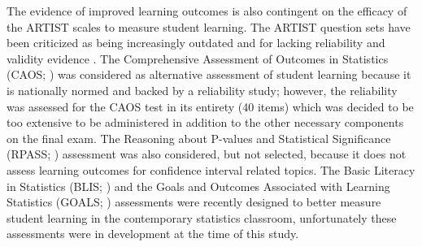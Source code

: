 

The evidence of improved learning outcomes is also contingent on the efficacy of the ARTIST scales to measure student learning. The ARTIST question sets have been criticized as being increasingly outdated and for lacking reliability and validity evidence \citep{Ziegler2014}. The Comprehensive Assessment of Outcomes in Statistics (CAOS; \citealt{DelMas2007}) was considered as alternative assessment of student learning because it is nationally normed and backed by a reliability study; however, the reliability was assessed for the CAOS test in its entirety (40 items) which was decided to be too extensive to be administered in addition to the other necessary components on the final exam. The Reasoning about P-values and Statistical Significance (RPASS; \citealt{LaneGetaz2013}) assessment was also considered, but not selected, because it does not assess learning outcomes for confidence interval related topics. The Basic Literacy in Statistics (BLIS; \citealt{Ziegler2014}) and the Goals and Outcomes Associated with Learning Statistics (GOALS; \citealt{Garfield2012}) assessments were recently designed to better measure student learning in the contemporary statistics classroom, unfortunately these assessments were in development at the time of this study.

